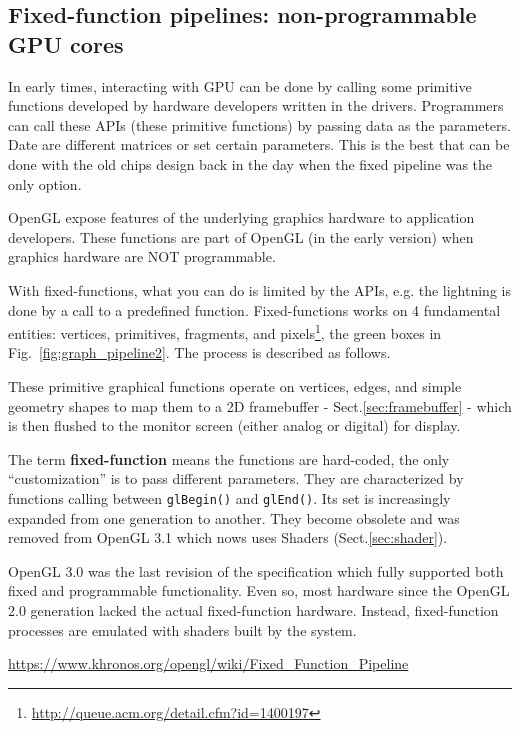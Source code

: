 \subsection{Fixed-function pipelines: non-programmable GPU cores}
\label{sec:fixed-function-pipeline}

In early times, interacting with GPU can be done by calling some primitive
functions developed by hardware developers written in the drivers. Programmers
can call these APIs (these primitive functions) by passing data as the
parameters.
Date are different matrices or set certain parameters. This is the best that can
be done with the old chips design back in the day when the fixed pipeline was
the only option.


OpenGL expose features of the underlying graphics hardware to application
developers. These functions are part of OpenGL (in the early version) when
graphics hardware are NOT programmable.


With fixed-functions, what you can do is limited by the APIs, e.g. the
lightning is done by a call to a predefined function. Fixed-functions
works on 4 fundamental entities: vertices, primitives, fragments, and
pixels\footnote{\url{http://queue.acm.org/detail.cfm?id=1400197}}, the
green boxes in Fig.~\ref{fig:graph_pipeline2}. The process is described as
follows.

These primitive graphical functions operate on vertices, edges, and simple
geometry shapes to map them to a 2D framebuffer - Sect.\ref{sec:framebuffer} -
which is then flushed to the monitor screen (either analog or digital) for
display. 

\begin{framed}

  The term {\bf fixed-function} means the functions are hard-coded, the only
  ``customization'' is to pass different parameters.  They are characterized by
  functions calling between \verb!glBegin()! and \verb!glEnd()!. Its set is
  increasingly expanded from one generation to another. They become obsolete and
  was removed from OpenGL 3.1 which nows uses Shaders (Sect.\ref{sec:shader}).
  
  OpenGL 3.0 was the last revision of the specification which fully supported
  both fixed and programmable functionality. Even so, most hardware since the
  OpenGL 2.0 generation lacked the actual fixed-function hardware. Instead,
  fixed-function processes are emulated with shaders built by the system.
  
  \url{https://www.khronos.org/opengl/wiki/Fixed_Function_Pipeline}
\end{framed}


